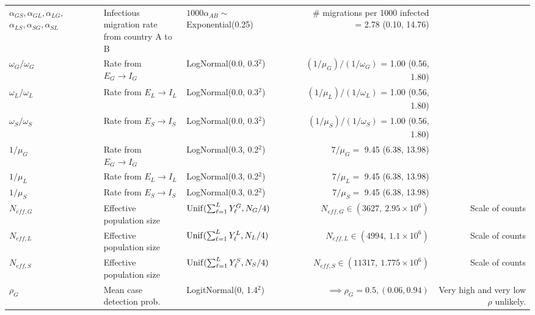 \begin{table}
\begin{fullpage}
\begin{tabular}{lllrr}
			\makecell[l]{$ \alpha_{GS},\alpha_{GL}, \alpha_{LG},$\\
			$ \alpha_{LS},\alpha_{SG}, \alpha_{SL} $} & \makecell[l]{Infectious migration rate \\ from country A to B} & $ 1000\alpha_{AB} \sim$ Exponential(0.25) & \makecell[r]{\# migrations per 1000 infected \\ = 2.78 (0.10, 14.76)} & \cite{dudas2017virus}\\ 
			$ \omega_G/\omega_G $ & Rate from $ E_G\rightarrow I_G $ & LogNormal(0.0, 0.3$ ^2 $) & $ (1/\mu_G)\big/(1/\omega_G) $ = 1.00 (0.56, 1.80) & \cite{chowell2014transmission,velasquez2015time,glynn2017variability} \\
			$ \omega_L/\omega_L $ & Rate from $ E_L\rightarrow I_L $ & LogNormal(0.0, 0.3$ ^2 $) & $ (1/\mu_L)\big/(1/\omega_L) $ = 1.00 (0.56, 1.80) & \cite{chowell2014transmission,velasquez2015time,glynn2017variability} \\
			$ \omega_S/\omega_S $ & Rate from $ E_S\rightarrow I_S $ & LogNormal(0.0, 0.3$ ^2 $) & $ (1/\mu_S)\big/(1/\omega_S) $ = 1.00 (0.56, 1.80) & \cite{chowell2014transmission,velasquez2015time,glynn2017variability} \\
			$ 1/\mu_G $ & Rate from $ E_G\rightarrow I_G $ &  LogNormal(0.3, 0.2$ ^2 $) & $ 7/\mu_G = $ 9.45 (6.38, 13.98) & \cite{chowell2014transmission,velasquez2015time,glynn2017variability} \\
			$ 1/\mu_L $ & Rate from $ E_L\rightarrow I_L $ &  LogNormal(0.3, 0.2$ ^2 $) & $ 7/\mu_L = $ 9.45 (6.38, 13.98) & \cite{chowell2014transmission,velasquez2015time,glynn2017variability} \\
			$ 1/\mu_S $ & Rate from $ E_S\rightarrow I_S $ &  LogNormal(0.3, 0.2$ ^2 $) & $ 7/\mu_S = $ 9.45 (6.38, 13.98) & \cite{chowell2014transmission,velasquez2015time,glynn2017variability} \\
			$ N_{eff,G} $ & Effective population size & $\mathrm{Unif}(\sum_{\ell=1}^{L}Y_\ell^G, N_G/4) $& $ N_{eff,G} \in (3627,\ 2.95\times10^6) $ & Scale of counts \\
			$ N_{eff,L} $ & Effective population size & $\mathrm{Unif}(\sum_{\ell=1}^{L}Y_\ell^L, N_L/4) $& $ N_{eff,L} \in (4994,\ 1.1\times10^6) $ & Scale of counts \\
			$ N_{eff,S} $ & Effective population size & $\mathrm{Unif}(\sum_{\ell=1}^{L}Y_\ell^S, N_S/4) $& $ N_{eff,S} \in (11317,\ 1.775\times10^6) $ & Scale of counts \\
			$ \rho_G $ &  Mean case detection prob. & LogitNormal(0, 1.4$ ^2 $) & $ \implies \rho_G = 0.5, (0.06, 0.94)$ & Very high and very low $ \rho $ unlikely. \\

\end{tabular}
\end{fullpage}
\end{table}
